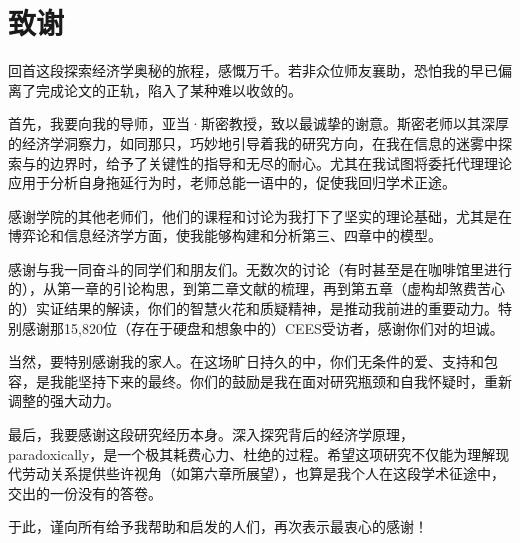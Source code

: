 \chapter{致谢}

回首这段探索经济学奥秘的旅程，感慨万千。若非众位师友襄助，恐怕我的早已偏离了完成论文的正轨，陷入了某种难以收敛的。

首先，我要向我的导师，亚当·斯密教授，致以最诚挚的谢意。斯密老师以其深厚的经济学洞察力，如同那只，巧妙地引导着我的研究方向，在我在信息的迷雾中探索与的边界时，给予了关键性的指导和无尽的耐心。尤其在我试图将委托代理理论应用于分析自身拖延行为时，老师总能一语中的，促使我回归学术正途。

感谢学院的其他老师们，他们的课程和讨论为我打下了坚实的理论基础，尤其是在{博弈论}和{信息经济学}方面，使我能够构建和分析第三、四章中的模型。

感谢与我一同奋斗的同学们和朋友们。无数次的讨论（有时甚至是在咖啡馆里进行的），从第一章的引论构思，到第二章文献的梳理，再到第五章（虚构却煞费苦心的）实证结果的解读，你们的智慧火花和质疑精神，是推动我前进的重要动力。特别感谢那15,820位（存在于硬盘和想象中的）CEES受访者，感谢你们对的坦诚。

当然，要特别感谢我的家人。在这场旷日持久的中，你们无条件的爱、支持和包容，是我能坚持下来的最终。你们的鼓励是我在面对研究瓶颈和自我怀疑时，重新调整的强大动力。

最后，我要感谢这段研究经历本身。深入探究背后的经济学原理， paradoxically，是一个极其耗费心力、杜绝的过程。希望这项研究不仅能为理解现代劳动关系提供些许视角（如第六章所展望），也算是我个人在这段学术征途中，交出的一份没有的答卷。

于此，谨向所有给予我帮助和启发的人们，再次表示最衷心的感谢！